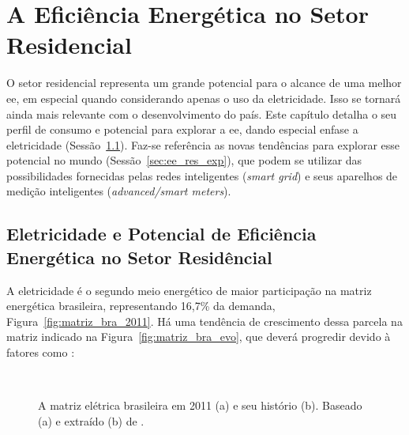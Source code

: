 \chapter{A Eficiência Energética no Setor Residencial}
\label{chap:ee_retorno}

O setor residencial representa um grande potencial para o alcance de uma melhor
\gls{ee}, em especial quando considerando apenas o uso da eletricidade. Isso se
tornará ainda mais relevante com o desenvolvimento do país. Este capítulo detalha
o seu perfil de consumo e potencial para explorar a \gls{ee}, dando 
especial enfase a eletricidade (Sessão~\ref{sec:ee_setor_residencial}). Faz-se
referência as novas tendências para explorar esse potencial no
mundo (Sessão~\ref{sec:ee_res_exp}), que podem se utilizar das possibilidades 
fornecidas pelas redes inteligentes (\emph{smart grid}) e seus aparelhos de 
medição inteligentes (\emph{advanced/smart meters}).

\section{Eletricidade e Potencial de Eficiência Energética 
no Setor Residêncial}
\label{sec:ee_setor_residencial}

A eletricidade é o segundo meio energético de maior participação na matriz 
energética brasileira, representando 16,7\% da demanda, 
Figura~\ref{fig:matriz_bra_2011}. 
Há uma tendência de crescimento dessa parcela na matriz indicado na 
Figura~\ref{fig:matriz_bra_evo}, que deverá progredir devido à fatores 
como \cite{iea_weo2010}:

\begin{figure}[h!t]
    \label{fig:eletricidade_brasil}
    \begin{center}
%
         \\ %
%
    \end{center}
    \caption[Matriz energética brasileira.]{A matriz elétrica brasileira
em 2011 (a) e seu histório (b). Baseado (a) e extraído (b) de \cite{ben2012}.}%
\end{figure}


